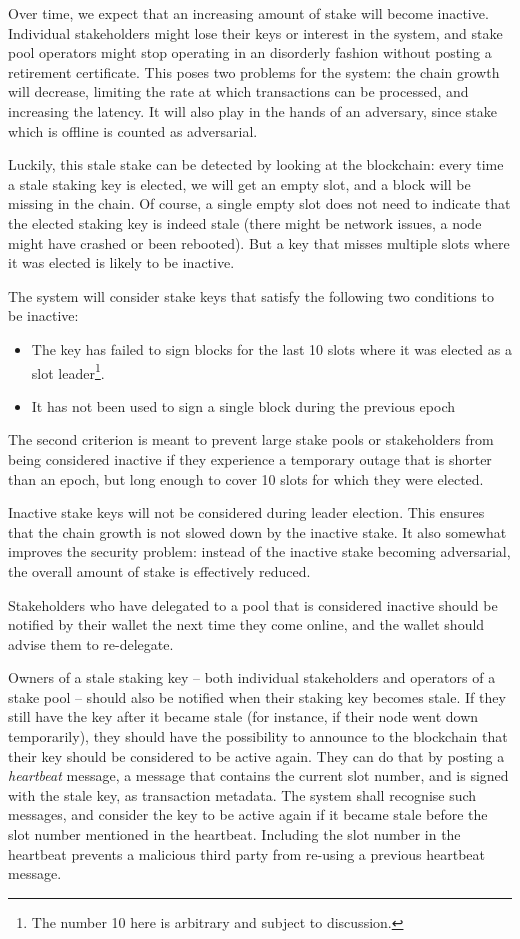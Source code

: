 \documentclass[11pt,a4paper]{article}
\begin{document}
Over time, we expect that an increasing amount of stake will become
inactive. Individual stakeholders might lose their keys or interest in
the system, and stake pool operators might stop operating in an
disorderly fashion without posting a retirement certificate. This poses
two problems for the system: the chain growth will decrease, limiting
the rate at which transactions can be processed, and increasing the
latency. It will also play in the hands of an adversary, since stake
which is offline is counted as adversarial.

Luckily, this stale stake can be detected by looking at the blockchain:
every time a stale staking key is elected, we will get an empty slot,
and a block will be missing in the chain. Of course, a single empty slot
does not need to indicate that the elected staking key is indeed stale
(there might be network issues, a node might have crashed or been
rebooted). But a key that misses multiple slots where it was elected is
likely to be inactive.

The system will consider stake keys that satisfy the following two
conditions to be inactive:

\begin{itemize}
\item
  The key has failed to sign blocks for the last 10 slots where it was
  elected as a slot leader\footnote{The number 10 here is arbitrary and
    subject to discussion.}.
\item
  It has not been used to sign a single block during the previous epoch
\end{itemize}

The second criterion is meant to prevent large stake pools or
stakeholders from being considered inactive if they experience a
temporary outage that is shorter than an epoch, but long enough to cover
10 slots for which they were elected.

Inactive stake keys will not be considered during leader election. This
ensures that the chain growth is not slowed down by the inactive stake.
It also somewhat improves the security problem: instead of the inactive
stake becoming adversarial, the overall amount of stake is effectively
reduced.

Stakeholders who have delegated to a pool that is considered inactive
should be notified by their wallet the next time they come online, and
the wallet should advise them to re-delegate.

Owners of a stale staking key -- both individual stakeholders and
operators of a stake pool -- should also be notified when their staking
key becomes stale. If they still have the key after it became stale (for
instance, if their node went down temporarily), they should have the
possibility to announce to the blockchain that their key should be
considered to be active again. They can do that by posting a
\emph{heartbeat} message, a message that contains the current slot
number, and is signed with the stale key, as transaction metadata. The
system shall recognise such messages, and consider the key to be active
again if it became stale before the slot number mentioned in the
heartbeat. Including the slot number in the heartbeat prevents a
malicious third party from re-using a previous heartbeat message.
\end{document}
